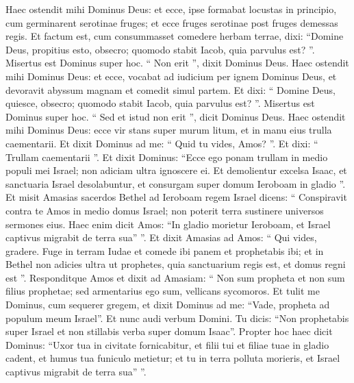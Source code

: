 \begin{biblechapter}
\begin{biblechapter}
\begin{biblechapter}
\begin{biblechapter}
\begin{biblechapter}
\begin{biblechapter}
\begin{biblechapter}
 \verse Haec ostendit mihi Dominus Deus: et ecce, ipse formabat locustas in principio, cum germinarent serotinae fruges; et ecce fruges serotinae post fruges demessas regis. 
\verse Et factum est, cum consummasset comedere herbam terrae, dixi: “Domine Deus, propitius esto, obsecro; quomodo stabit Iacob, quia parvulus est? ”. 
\verse Misertus est Dominus super hoc. “ Non erit ”, dixit Dominus Deus.
 \verse Haec ostendit mihi Dominus Deus: et ecce, vocabat ad iudicium per ignem Dominus Deus, et devoravit abyssum magnam et comedit simul partem. 
\verse Et dixi: “ Domine Deus, quiesce, obsecro; quomodo stabit Iacob, quia parvulus est? ”. 
\verse Misertus est Dominus super hoc. “ Sed et istud non erit ”, dicit Dominus Deus.
 \verse Haec ostendit mihi Dominus Deus: ecce vir stans super murum litum, et in manu eius trulla caementarii. 
\verse Et dixit Dominus ad me: “ Quid tu vides, Amos? ”. Et dixi: “ Trullam caementarii ”. Et dixit Dominus: “Ecce ego ponam trullam in medio populi mei Israel; non adiciam ultra ignoscere ei. 
\verse Et demolientur excelsa Isaac, et sanctuaria Israel desolabuntur, et consurgam super domum Ieroboam in gladio ”.
 \verse Et misit Amasias sacerdos Bethel ad Ieroboam regem Israel dicens: “ Conspiravit contra te Amos in medio domus Israel; non poterit terra sustinere universos sermones eius. 
\verse Haec enim dicit Amos: “In gladio morietur Ieroboam, et Israel captivus migrabit de terra sua” ”. 
\verse Et dixit Amasias ad Amos: “ Qui vides, gradere. Fuge in terram Iudae et comede ibi panem et prophetabis ibi; 
\verse et in Bethel non adicies ultra ut prophetes, quia sanctuarium regis est, et domus regni est ”. 
\verse Responditque Amos et dixit ad Amasiam:
 “ Non sum propheta
 et non sum filius prophetae;
 sed armentarius ego sum, vellicans sycomoros.
 \verse Et tulit me Dominus,
 cum sequerer gregem,
 et dixit Dominus ad me:
 “Vade, propheta ad populum meum Israel”.
 \verse Et nunc audi verbum Domini. Tu dicis: “Non prophetabis super Israel et non stillabis verba super domum Isaac”. 
\verse Propter hoc haec dicit Dominus: “Uxor tua in civitate fornicabitur, et filii tui et filiae tuae in gladio cadent, et humus tua funiculo metietur; et tu in terra polluta morieris, et Israel captivus migrabit de terra sua” ”.
 

\end{biblechapter}
\end{biblechapter}
\end{biblechapter}
\end{biblechapter}
\end{biblechapter}
\end{biblechapter}
\end{biblechapter}
